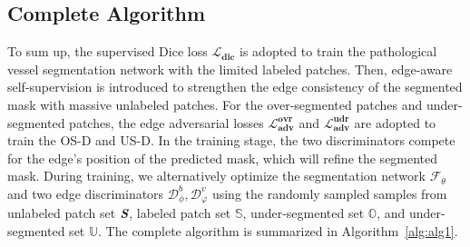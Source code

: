 \documentclass[letterpaper]{article} %
\begin{document}
\subsection{Complete Algorithm}
To sum up, the supervised Dice loss $\mathbf{\mathcal{L}_{dic}}$ is adopted to train the pathological vessel segmentation network with the limited labeled patches.
Then, edge-aware self-supervision is introduced to strengthen the edge consistency of the segmented mask with massive unlabeled patches.
For the over-segmented patches and under-segmented patches,
the edge adversarial losses $\mathbf{\mathcal{L}^{ovr}_{adv}}$ and $\mathbf{\mathcal{L}^{udr}_{adv}}$ are adopted to train the OS-D and US-D.
In the training stage, the two discriminators compete for the edge's position of the predicted mask, which will refine the segmented mask.
During training, we alternatively optimize the segmentation network $\mathcal{F}_{\theta}$ and two edge discriminators $ \mathcal{D}^b_{\phi},\mathcal{D}^v_{\varphi}$ using the randomly sampled samples from
unlabeled patch set $\textbf{\em S}$, labeled patch set $\mathbb{S}$, under-segmented set $\mathbb{O}$, and under-segmented set $\mathbb{U}$. The complete algorithm is summarized in Algorithm~\ref{alg:alg1}.
\end{document}
